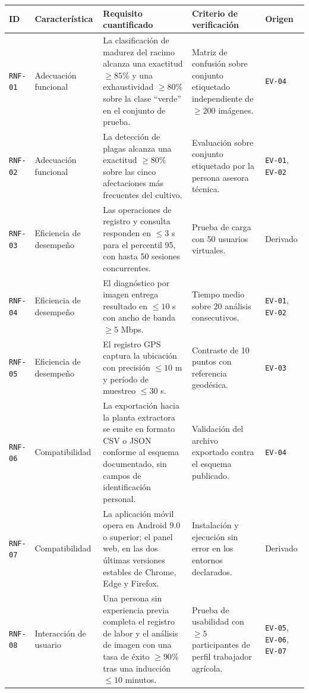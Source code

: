 \documentclass[11pt,a4paper]{article}
\newcommand{\id}[1]{\texttt{\begingroup\hyphenpenalty=10000\relax#1\endgroup}}
\renewcommand{\id}[1]{\texttt{#1}}
\begin{document}
{\setlength{\tabcolsep}{4pt}
\begin{longtable}{|C{1.2cm}|L{2.4cm}|L{5.8cm}|L{3.1cm}|L{2.2cm}|}
\hline
{}\textbf{ID} & \textbf{Característica} & \textbf{Requisito cuantificado} & \textbf{Criterio de verificación} & \textbf{Origen} \\
\hline
\endhead
\id{RNF-01} & Adecuación funcional & La clasificación de madurez del racimo alcanza una exactitud $\geq 85\%$ y una exhaustividad $\geq 80\%$ sobre la clase ``verde'' en el conjunto de prueba. & Matriz de confusión sobre conjunto etiquetado independiente de $\geq 200$ imágenes. & \footnotesize \id{EV-04} \\ \hline
\id{RNF-02} & Adecuación funcional & La detección de plagas alcanza una exactitud $\geq 80\%$ sobre las cinco afectaciones más frecuentes del cultivo. & Evaluación sobre conjunto etiquetado por la persona asesora técnica. & \footnotesize \id{EV-01}, \id{EV-02} \\ \hline
\id{RNF-03} & Eficiencia de desempeño & Las operaciones de registro y consulta responden en $\leq 3$ s para el percentil 95, con hasta 50 sesiones concurrentes. & Prueba de carga con 50 usuarios virtuales. & \footnotesize Derivado \\ \hline
\id{RNF-04} & Eficiencia de desempeño & El diagnóstico por imagen entrega resultado en $\leq 10$ s con ancho de banda $\geq 5$ Mbps. & Tiempo medio sobre 20 análisis consecutivos. & \footnotesize \id{EV-01}, \id{EV-02} \\ \hline
\id{RNF-05} & Eficiencia de desempeño & El registro GPS captura la ubicación con precisión $\leq 10$ m y período de muestreo $\leq 30$ s. & Contraste de 10 puntos con referencia geodésica. & \footnotesize \id{EV-03} \\ \hline
\id{RNF-06} & Compatibilidad & La exportación hacia la planta extractora se emite en formato CSV o JSON conforme al esquema documentado, sin campos de identificación personal. & Validación del archivo exportado contra el esquema publicado. & \footnotesize \id{EV-04} \\ \hline
\id{RNF-07} & Compatibilidad & La aplicación móvil opera en Android 9.0 o superior; el panel web, en las dos últimas versiones estables de Chrome, Edge y Firefox. & Instalación y ejecución sin error en los entornos declarados. & \footnotesize Derivado \\ \hline
\id{RNF-08} & Interacción de usuario & Una persona sin experiencia previa completa el registro de labor y el análisis de imagen con una tasa de éxito $\geq 90\%$ tras una inducción $\leq 10$ minutos. & Prueba de usabilidad con $\geq 5$ participantes de perfil trabajador agrícola. & \id{EV-05}, \id{EV-06}, \id{EV-07} \\ \hline

\end{longtable}}
\end{document}

